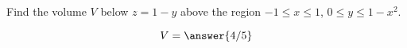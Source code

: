 \documentclass{ximera}
\author{David Guichard \and Neal Koblitz \and H. Jerome Keisler \and Albert Scheller \and Barry Balof \and Mike Wills \and Matthew Carr}
\begin{document}
\begin{exercise}



Find the volume $V$ below $z=1-y$ above the region $-1\le x\le 1$, $0\le y\le 1-x^2$.
\begin{prompt}
\[
V=\answer{4/5}
\]
\end{prompt}



\end{exercise}
\end{document}
